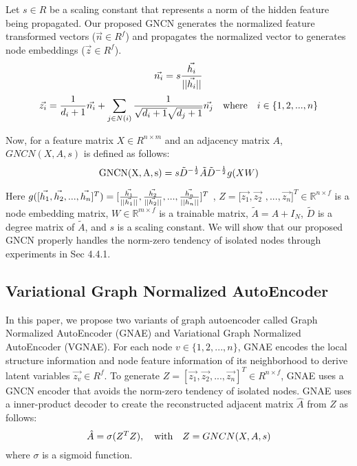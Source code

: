 \documentclass[sigconf]{acmart}
\begin{document}
Let $s \in R$ be a scaling constant that represents a norm of the hidden feature being propagated.
Our proposed GNCN generates the normalized feature transformed vectors ($\vec{n} \in R^f$) and propagates the normalized
vector to generates node embeddings ($\vec{z} \in R^f$).
\begin{equation}
    \vec{n_i} = s {\vec{h_i} \over ||\vec{h_i}||}
\end{equation}
\begin{equation}
    \vec{z_i} = {1 \over {d_i}+1} \vec{n_i} + \sum_{j\in N(i)}{1 \over \sqrt{d_i+1}\sqrt{d_j+1}} \vec{n_j} \quad {\rm where} \quad i \in \{1,2,...,n\}
\end{equation}

Now, for a feature matrix $X \in R^{n \times m}$ and an adjacency matrix $A$, $GNCN(X,A,s)$ is defined as follows:
\begin{equation}
    {\rm GNCN(X,A,s)} = s\tilde{D}^{-{1 \over 2}}\tilde{A}\tilde{D}^{-{1 \over 2}} g(XW)
\end{equation}

Here $g([\vec{h_1}, \vec{h_2}, ... , \vec{h_n}]^T) = [{\vec{h_1} \over ||\vec{h_1}||}, {\vec{h_2} \over ||\vec{h_2}||}, ..., {\vec{h_n} \over ||\vec{h_n}||}]^T$ , $Z = [\vec{z_1}, \vec{z_2}$ $, ... , \vec{z_n}]^T \in \mathbb{R}^{n \times f}$ is a node embedding matrix, $W \in \mathbb{R}^{m \times f}$ is a trainable matrix, $\tilde{A} = A+I_N$, $\tilde{D}$ is a degree matrix of $\tilde{A}$, and $s$ is a scaling constant. 
We will show that our proposed GNCN properly handles the norm-zero tendency of isolated nodes through experiments in Sec 4.4.1.


\subsection{Variational Graph Normalized AutoEncoder}

In this paper, we propose two variants of graph autoencoder called Graph Normalized AutoEncoder (GNAE) and Variational Graph Normalized AutoEncoder (VGNAE).
For each node $v \in \{1,2,...,n\}$, GNAE encodes the local structure information and node feature information of its neighborhood to derive latent variables $\vec{z_v} \in R^f$.
To generate $Z=[\vec{z_1},\vec{z_2},...,\vec{z_n}]^T\in R^{n \times f}$, GNAE uses a GNCN encoder that avoids the norm-zero tendency of isolated nodes.
GNAE uses a inner-product decoder to create the reconstructed adjacent matrix $\hat{A}$ from $Z$ as follows:
\begin{equation}
   \hat{A} = \sigma(Z^T Z), \quad {\rm with} \quad    Z = GNCN(X,A,s)
\end{equation}
where $\sigma$ is a sigmoid function.
\end{document}
